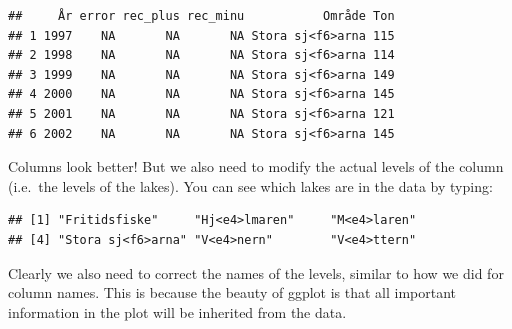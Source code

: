 \documentclass[]{article}
\newenvironment{Shaded}{\begin{snugshade}}{\end{snugshade}}
\newcommand{\KeywordTok}[1]{\textcolor[rgb]{0.13,0.29,0.53}{\textbf{#1}}}
\newcommand{\DataTypeTok}[1]{\textcolor[rgb]{0.13,0.29,0.53}{#1}}
\newcommand{\StringTok}[1]{\textcolor[rgb]{0.31,0.60,0.02}{#1}}
\newcommand{\OperatorTok}[1]{\textcolor[rgb]{0.81,0.36,0.00}{\textbf{#1}}}
\newcommand{\NormalTok}[1]{#1}
\begin{document}
\begin{Shaded}
\end{Shaded}

\begin{verbatim}
##     År error rec_plus rec_minu           Område Ton
## 1 1997    NA       NA       NA Stora sj<f6>arna 115
## 2 1998    NA       NA       NA Stora sj<f6>arna 114
## 3 1999    NA       NA       NA Stora sj<f6>arna 149
## 4 2000    NA       NA       NA Stora sj<f6>arna 145
## 5 2001    NA       NA       NA Stora sj<f6>arna 121
## 6 2002    NA       NA       NA Stora sj<f6>arna 145
\end{verbatim}

Columns look better! But we also need to modify the actual levels of the
column (i.e.~the levels of the lakes). You can see which lakes are in
the data by typing:

\begin{Shaded}
\end{Shaded}

\begin{verbatim}
## [1] "Fritidsfiske"     "Hj<e4>lmaren"     "M<e4>laren"      
## [4] "Stora sj<f6>arna" "V<e4>nern"        "V<e4>ttern"
\end{verbatim}

Clearly we also need to correct the names of the levels, similar to how
we did for column names. This is because the beauty of ggplot is that
all important information in the plot will be inherited from the data.

\begin{Shaded}
\end{Shaded}
\end{document}
